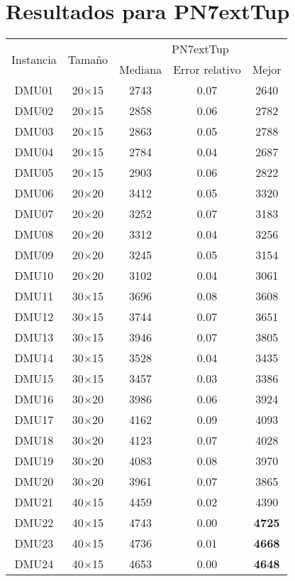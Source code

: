 \section{Resultados para PN7extTup}

\begin{table}[H]
\centering
\begin{tabular}{@{}ccccc@{}}
\toprule
\multirow{2}{*}{Instancia} & \multirow{2}{*}{Tamaño} & \multicolumn{3}{c}{PN7extTup} \\ \cmidrule(lr){3-5}
& & Mediana& Error relativo & Mejor  \\ \midrule
DMU01 & 20$\times$15 & 2743 & 0.07 & 2640\\ 
DMU02 & 20$\times$15 & 2858 & 0.06 & 2782\\ 
DMU03 & 20$\times$15 & 2863 & 0.05 & 2788\\ 
DMU04 & 20$\times$15 & 2784 & 0.04 & 2687\\ 
DMU05 & 20$\times$15 & 2903 & 0.06 & 2822\\ 
DMU06 & 20$\times$20 & 3412 & 0.05 & 3320\\ 
DMU07 & 20$\times$20 & 3252 & 0.07 & 3183\\ 
DMU08 & 20$\times$20 & 3312 & 0.04 & 3256\\ 
DMU09 & 20$\times$20 & 3245 & 0.05 & 3154\\ 
DMU10 & 20$\times$20 & 3102 & 0.04 & 3061\\ 
DMU11 & 30$\times$15 & 3696 & 0.08 & 3608\\ 
DMU12 & 30$\times$15 & 3744 & 0.07 & 3651\\ 
DMU13 & 30$\times$15 & 3946 & 0.07 & 3805\\ 
DMU14 & 30$\times$15 & 3528 & 0.04 & 3435\\ 
DMU15 & 30$\times$15 & 3457 & 0.03 & 3386\\ 
DMU16 & 30$\times$20 & 3986 & 0.06 & 3924\\ 
DMU17 & 30$\times$20 & 4162 & 0.09 & 4093\\ 
DMU18 & 30$\times$20 & 4123 & 0.07 & 4028\\ 
DMU19 & 30$\times$20 & 4083 & 0.08 & 3970\\ 
DMU20 & 30$\times$20 & 3961 & 0.07 & 3865\\ 
DMU21 & 40$\times$15 & 4459 & 0.02 & 4390\\ 
DMU22 & 40$\times$15 & 4743 & 0.00 & \textbf{4725}\\ 
DMU23 & 40$\times$15 & 4736 & 0.01 & \textbf{4668}\\ 
DMU24 & 40$\times$15 & 4653 & 0.00 & \textbf{4648}\\ 

\end{tabular}
\end{table}
